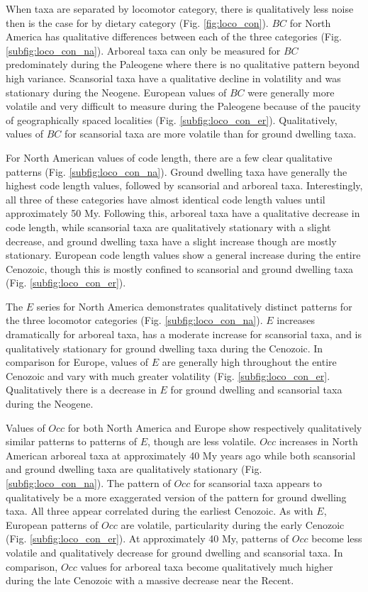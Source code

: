 \documentclass[12pt,letterpaper]{article}
\begin{document}
When taxa are separated by locomotor category, there is qualitatively less noise then is the case for by dietary category (Fig. \ref{fig:loco_con}). \(BC\) for North America has qualitative differences between each of the three categories (Fig. \ref{subfig:loco_con_na}). Arboreal taxa can only be measured for \(BC\) predominately during the Paleogene where there is no qualitative pattern beyond high variance. Scansorial taxa have a qualitative decline in volatility and was stationary during the Neogene. European values of \(BC\) were generally more volatile and very difficult to measure during the Paleogene because of the paucity of geographically spaced localities (Fig. \ref{subfig:loco_con_er}). Qualitatively, values of \(BC\) for scansorial taxa are more volatile than for ground dwelling taxa. 

For North American values of code length, there are a few clear qualitative patterns (Fig. \ref{subfig:loco_con_na}). Ground dwelling taxa have generally the highest code length values, followed by scansorial and arboreal taxa. Interestingly, all three of these categories have almost identical code length values until approximately 50 My. Following this, arboreal taxa have a qualitative decrease in code length, while scansorial taxa are qualitatively stationary with a slight decrease, and ground dwelling taxa have a slight increase though are mostly stationary. European code length values show a general increase during the entire Cenozoic, though this is mostly confined to scansorial and ground dwelling taxa (Fig. \ref{subfig:loco_con_er}).

The \(E\) series for North America demonstrates qualitatively distinct patterns for the three locomotor categories (Fig. \ref{subfig:loco_con_na}). \(E\) increases dramatically for arboreal taxa, has a moderate increase for scansorial taxa, and is qualitatively stationary for ground dwelling taxa during the Cenozoic. In comparison for Europe, values of \(E\) are generally high throughout the entire Cenozoic and vary with much greater volatility (Fig. \ref{subfig:loco_con_er}. Qualitatively there is a decrease in \(E\) for ground dwelling and scansorial taxa during the Neogene.

Values of \(Occ\) for both North America and Europe show respectively qualitatively similar patterns to patterns of \(E\), though are less volatile. \(Occ\) increases in North American arboreal taxa at approximately 40 My years ago while both scansorial and ground dwelling taxa are qualitatively stationary (Fig. \ref{subfig:loco_con_na}). The pattern of \(Occ\) for scansorial taxa appears to qualitatively be a more exaggerated version of the pattern for ground dwelling taxa. All three appear correlated during the earliest Cenozoic. As with \(E\), European patterns of \(Occ\) are volatile, particularity during the early Cenozoic (Fig. \ref{subfig:loco_con_er}). At approximately 40 My, patterns of \(Occ\) become less volatile and qualitatively decrease for ground dwelling and scansorial taxa. In comparison, \(Occ\) values for arboreal taxa become qualitatively much higher during the late Cenozoic with a massive decrease near the Recent.
\end{document}
